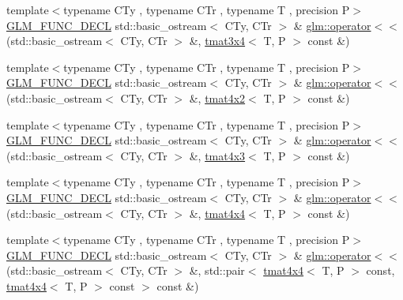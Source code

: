 \begin{DoxyCompactItemize}
\item 
{\footnotesize template$<$typename C\+Ty , typename C\+Tr , typename T , precision P$>$ }\\\mbox{\hyperlink{setup_8hpp_ab2d052de21a70539923e9bcbf6e83a51}{G\+L\+M\+\_\+\+F\+U\+N\+C\+\_\+\+D\+E\+CL}} std\+::basic\+\_\+ostream$<$ C\+Ty, C\+Tr $>$ \& \mbox{\hyperlink{group__gtx__io_ga5a5ca6f99c027a2277b24de487198fe0}{glm\+::operator$<$$<$}} (std\+::basic\+\_\+ostream$<$ C\+Ty, C\+Tr $>$ \&, \mbox{\hyperlink{structglm_1_1tmat3x4}{tmat3x4}}$<$ T, P $>$ const \&)
\item 
{\footnotesize template$<$typename C\+Ty , typename C\+Tr , typename T , precision P$>$ }\\\mbox{\hyperlink{setup_8hpp_ab2d052de21a70539923e9bcbf6e83a51}{G\+L\+M\+\_\+\+F\+U\+N\+C\+\_\+\+D\+E\+CL}} std\+::basic\+\_\+ostream$<$ C\+Ty, C\+Tr $>$ \& \mbox{\hyperlink{group__gtx__io_ga8ce3cf61260e62080a9596c2f10ab4a0}{glm\+::operator$<$$<$}} (std\+::basic\+\_\+ostream$<$ C\+Ty, C\+Tr $>$ \&, \mbox{\hyperlink{structglm_1_1tmat4x2}{tmat4x2}}$<$ T, P $>$ const \&)
\item 
{\footnotesize template$<$typename C\+Ty , typename C\+Tr , typename T , precision P$>$ }\\\mbox{\hyperlink{setup_8hpp_ab2d052de21a70539923e9bcbf6e83a51}{G\+L\+M\+\_\+\+F\+U\+N\+C\+\_\+\+D\+E\+CL}} std\+::basic\+\_\+ostream$<$ C\+Ty, C\+Tr $>$ \& \mbox{\hyperlink{group__gtx__io_gaca75b14a0534a02860349a114a10aa44}{glm\+::operator$<$$<$}} (std\+::basic\+\_\+ostream$<$ C\+Ty, C\+Tr $>$ \&, \mbox{\hyperlink{structglm_1_1tmat4x3}{tmat4x3}}$<$ T, P $>$ const \&)
\item 
{\footnotesize template$<$typename C\+Ty , typename C\+Tr , typename T , precision P$>$ }\\\mbox{\hyperlink{setup_8hpp_ab2d052de21a70539923e9bcbf6e83a51}{G\+L\+M\+\_\+\+F\+U\+N\+C\+\_\+\+D\+E\+CL}} std\+::basic\+\_\+ostream$<$ C\+Ty, C\+Tr $>$ \& \mbox{\hyperlink{group__gtx__io_ga6683acc91ba7ce5822e25a2517550bff}{glm\+::operator$<$$<$}} (std\+::basic\+\_\+ostream$<$ C\+Ty, C\+Tr $>$ \&, \mbox{\hyperlink{structglm_1_1tmat4x4}{tmat4x4}}$<$ T, P $>$ const \&)
\item 
{\footnotesize template$<$typename C\+Ty , typename C\+Tr , typename T , precision P$>$ }\\\mbox{\hyperlink{setup_8hpp_ab2d052de21a70539923e9bcbf6e83a51}{G\+L\+M\+\_\+\+F\+U\+N\+C\+\_\+\+D\+E\+CL}} std\+::basic\+\_\+ostream$<$ C\+Ty, C\+Tr $>$ \& \mbox{\hyperlink{group__gtx__io_ga67ab2a9a13c872bd33e6a0455c97ce9c}{glm\+::operator$<$$<$}} (std\+::basic\+\_\+ostream$<$ C\+Ty, C\+Tr $>$ \&, std\+::pair$<$ \mbox{\hyperlink{structglm_1_1tmat4x4}{tmat4x4}}$<$ T, P $>$ const, \mbox{\hyperlink{structglm_1_1tmat4x4}{tmat4x4}}$<$ T, P $>$ const $>$ const \&)
\end{DoxyCompactItemize}


